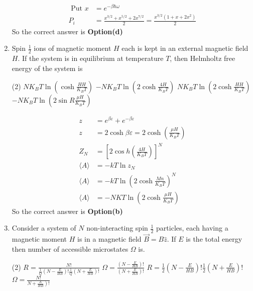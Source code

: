 \begin{enumerate}
\begin{answer}
\begin{align*}
	\text { Put } x&=e^{-\beta \hbar \omega}\\
	P_{i}&=\frac{x^{3 / 2}+x^{5 / 2}+2 x^{7 / 2}}{2}=\frac{x^{3 / 2}\left(1+x+2 x^{2}\right)}{2}
	\end{align*}
	So the correct answer is \textbf{Option(d)}
\end{answer}
	\item Spin $\frac{1}{2}$ ions of magnetic moment $H$ each is kept in an external magnetic field $H$. If the system is in equilibrium at temperature $T$, then Helmholtz free energy of the system is 
		\begin{tasks}(2)
			\task[\textbf{a.}]$N K_{B} T \ln \left(\cosh \frac{H H}{K_{B} T}\right)$
			\task[\textbf{b.}]$-N K_{B} T \ln \left(2 \cosh \frac{4 H}{K_{B} T}\right)$
			\task[\textbf{c.}]$N K_{B} T \ln \left(2 \cosh \frac{H H}{K_{B} T}\right)$
			\task[\textbf{d.}] $-N K_{B} T \ln \left(2 \sin R \frac{\mu H}{K_{B} T}\right)$
		\end{tasks}
	\begin{answer}
		\begin{align*}
		z&=e^{\beta \varepsilon}+e^{-\beta \varepsilon}\\
		z&=2 \cosh \beta \varepsilon=2 \cosh \left(\frac{\mu H}{K_{B} T}\right)\\
		Z_{N}&=\left[2 \cos h\left(\frac{4 H}{K_{B} T}\right)\right]^{N}\\
		\langle A\rangle&=-k T \ln z_{N}\\
		\langle A\rangle&=-k T \ln \left(2 \cosh \frac{M n}{K_{B} T}\right)^{N}\\
		\langle A\rangle&=-N K T \ln \left(2 \cosh \frac{\mu H}{K_{B} T}\right)
		\end{align*}
		So the correct answer is \textbf{Option(b)}
	\end{answer}
\item Consider a system of $N$ non-interacting spin $\frac{1}{2}$ particles, each having a magnetic moment $H$ is in a magnetic field $\vec{B}=B \hat{z} $. If $E$ is the total energy then number of accessible microstates $\Omega$ is.
\begin{tasks}(2)
	\task[\textbf{a.}]$R=\frac{N !}{\frac{1}{Q}\left(N-\frac{E}{H B}\right) ! \frac{1}{Q}\left(N+\frac{E}{H B}\right) !}$
	\task[\textbf{b.}]$\Omega=\frac{\left(N-\frac{E}{H B}\right) !}{\left(N+\frac{E}{H B}\right) !}$
	\task[\textbf{c.}]$R=\frac{1}{2}\left(N-\frac{E}{H B}\right) ! \frac{1}{2}\left(N+\frac{E}{H B}\right) !$
	\task[\textbf{d.}] $\Omega=\frac{N !}{\left.N+\frac{E}{H B}\right) !}$
\end{tasks}

\end{enumerate}
